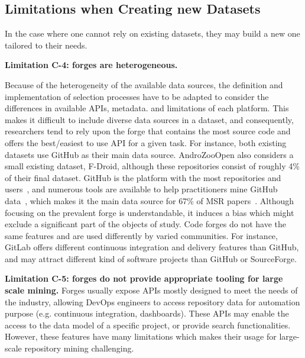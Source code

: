 \subsection{Limitations when Creating new Datasets}

In the case where one cannot rely on existing datasets, they may build a new one tailored to their needs.

\bigskip

\textbf{Limitation C-4: forges are heterogeneous.} 

Because of the heterogeneity of the available data sources, the definition and implementation of selection processes have to be adapted to consider the differences in available APIs, metadata. and limitations of each platform. This makes it difficult to include diverse data sources in a dataset, and consequently, researchers tend to rely upon the forge that contains the most source code and offers the best/easiest to use API for a given task.
For instance, both existing datasets use GitHub as their main data source. AndroZooOpen also considers a small existing dataset, F-Droid, although these repositories consist of roughly 4\% of their final dataset. GitHub is the platform with the most repositories and users~\cite{tutko2022software}, and  numerous tools are available to help practitioners mine GitHub data~\cite{dyer2015boa, gousios2013ghtorent}, which makes it the main data source for 67\% of MSR papers~\cite{vidoni2022systematic}. Although focusing on the prevalent forge is understandable, it induces a bias which might exclude a significant part of the objects of study. Code forges do not have the same features and are used differently by varied communities. For instance, GitLab offers different continuous integration and delivery features than GitHub, and may attract different kind of software projects than GitHub or SourceForge.




\bigskip

\textbf{Limitation C-5: forges do not provide appropriate tooling for large scale mining.}
Forges usually expose APIs mostly designed to meet the needs of the industry, allowing DevOps engineers to access repository data for automation purpose (e.g. continuous integration, dashboards).
These APIs may enable the access to the data model of a specific project, or provide search functionalities.
However, these features have many limitations which makes their usage for large-scale repository mining challenging. 

